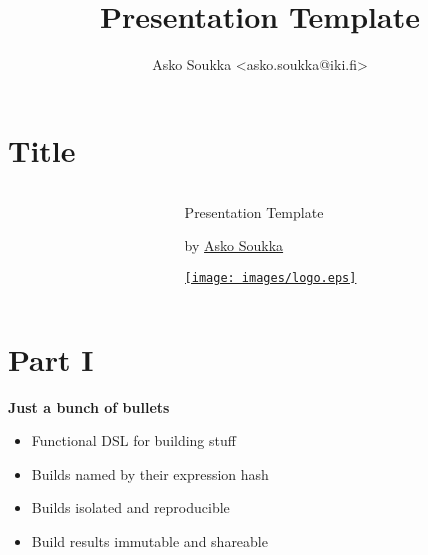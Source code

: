 \documentclass[aspectratio=169]{beamer}
\title{Presentation Template}
\author{Asko Soukka <asko.soukka@iki.fi>}
\begin{document}
\section{Title}

{
\begin{frame}[plain,t]
  \begin{columns}[onlytextwidth]
    \begin{column}{0.45\textwidth}
    \end{column}
    \begin{column}{0.40\textwidth}
      \vspace{1.0cm}
      \Huge
      \bfseries
      \par Presentation Template\par
      \vspace{0.5cm}
      \large
      \mdseries
      by \href{https://iki.fi/asko.soukka/}{Asko Soukka}
      \vspace{2.0cm}\par
      \href{https://www.jyu.fi/}{\texttt{[image: images/logo.eps]}}
    \end{column}
  \end{columns}
\end{frame}
}

\section{Part I}

{
%
\begin{frame}[plain,t]
  \vfill
  \centering
  \Huge
  \bfseries
\end{frame}
}

\begin{frame}[plain,t]
  \vspace{1.0cm}\par
  \Huge
  \bfseries
  \centering Just a bunch of bullets
  \huge
  \vspace{1.0cm}\par
  \mdseries
  \begin{itemize}[label=--]
    \item Functional DSL for building stuff
    \item Builds named by their expression hash
    \item Builds isolated and reproducible
    \item Build results immutable and shareable
  \end{itemize}
\end{frame}
\end{document}

